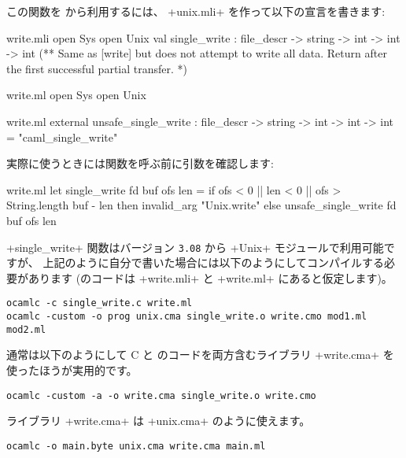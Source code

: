 この関数を \ocaml から利用するには、 \ml+unix.mli+ を作って以下の宣言を書きます:
%
\begin{codefile}{write.mli}
open Sys
open Unix
val single_write : file_descr -> string -> int -> int -> int
(** Same as [write] but does not attempt to write all data. Return after
the first successful partial transfer. *)
\end{codefile}
%
\begin{codefile}{write.ml}
open Sys
open Unix
\end{codefile}
%
\begin{listingcodefile}{write.ml}
external unsafe_single_write :
  file_descr -> string -> int -> int -> int = "caml_single_write"
\end{listingcodefile}
%
実際に使うときには関数を呼ぶ前に引数を確認します:
\begin{listingcodefile}{write.ml}
let single_write fd buf ofs len =
  if ofs < 0 || len < 0 || ofs > String.length buf - len
  then invalid_arg "Unix.write"
  else unsafe_single_write fd buf ofs len
\end{listingcodefile}
%
\ml+single_write+ 関数はバージョン \texttt{3.08} から \ml+Unix+ モジュールで利用可能ですが、
上記のように自分で書いた場合には以下のようにしてコンパイルする必要があります
(\ocaml のコードは \ml+write.mli+ と \ml+write.ml+ にあると仮定します)。
%
\begin{lstlisting}
ocamlc -c single_write.c write.ml
ocamlc -custom -o prog unix.cma single_write.o write.cmo mod1.ml mod2.ml
\end{lstlisting}
%
通常は以下のようにして C と \ocaml のコードを両方含むライブラリ \ml+write.cma+ を
使ったほうが実用的です。
%
\begin{lstlisting}
ocamlc -custom -a -o write.cma single_write.o write.cmo
\end{lstlisting}
%
ライブラリ \ml+write.cma+ は \ml+unix.cma+ のように使えます。
%
\begin{lstlisting}
ocamlc -o main.byte unix.cma write.cma main.ml
\end{lstlisting}


